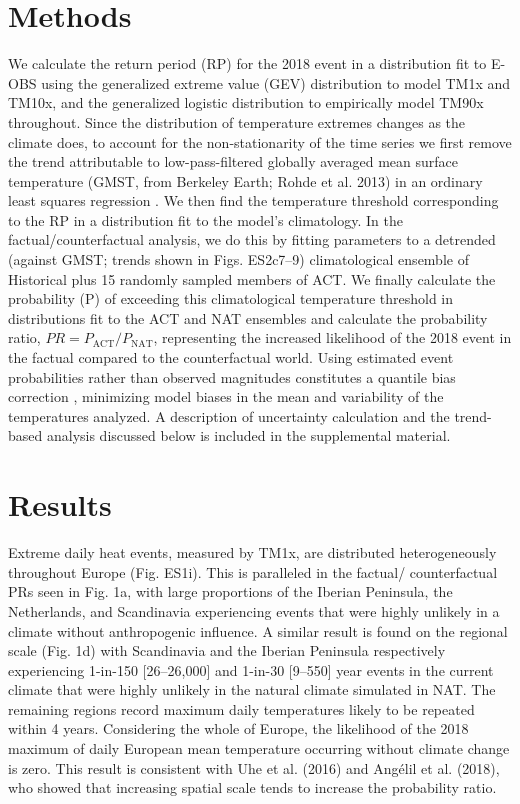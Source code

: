 \section{Methods}
We calculate the return period (RP) for the 2018 event in a distribution fit to E-OBS using the generalized extreme value (GEV) distribution to model TM1x and TM10x, and the generalized logistic distribution to empirically model TM90x throughout. Since the distribution of temperature extremes changes as the climate does, to account for the non-stationarity of the time series we first remove the trend attributable to low-pass-filtered globally averaged mean surface temperature (GMST, from Berkeley Earth; Rohde et al. 2013) in an ordinary least squares regression \citep[the regression coefficient or trend is shown in the supplemental material in Fig. ES1;][]{diffenbaugh_quantifying_2017}. We then find the temperature threshold corresponding to the RP in a distribution fit to the model's climatology. In the factual/counterfactual analysis, we do this by fitting parameters to a detrended (against GMST; trends shown in Figs. ES2c7--9) climatological ensemble of Historical plus 15 randomly sampled members of ACT. We finally calculate the probability (P) of exceeding this climatological temperature threshold in distributions fit to the ACT and NAT ensembles and calculate the probability ratio, $PR = P_{\mathrm{ACT}}/P_{\mathrm{NAT}}$, representing the increased likelihood of the 2018 event in the factual compared to the counterfactual world. Using estimated event probabilities rather than observed magnitudes constitutes a quantile bias correction \citep{jeon_quantile-based_2016}, minimizing model biases in the mean and variability of the temperatures analyzed. A description of uncertainty calculation and the trend-based analysis discussed below is included in the supplemental material.

\section{Results}

  Extreme daily heat events, measured by TM1x, are distributed heterogeneously throughout Europe (Fig. ES1i). This is paralleled in the factual/ counterfactual PRs seen in Fig. 1a, with large proportions of the Iberian Peninsula, the Netherlands, and Scandinavia experiencing events that were highly unlikely in a climate without anthropogenic influence. A similar result is found on the regional scale (Fig. 1d) with Scandinavia and the Iberian Peninsula respectively experiencing 1-in-150 [26--26,000] and 1-in-30 [9--550] year events in the current climate that were highly unlikely in the natural climate simulated in NAT. The remaining regions record maximum daily temperatures likely to be repeated within 4 years. Considering the whole of Europe, the likelihood of the 2018 maximum of daily European mean temperature occurring without climate change is zero. This result is consistent with Uhe et al. (2016) and Angélil et al. (2018), who showed that increasing spatial scale tends to increase the probability ratio.

